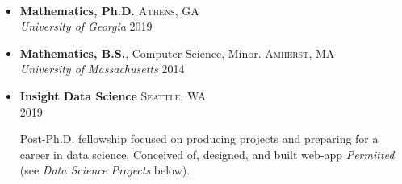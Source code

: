 \documentclass[10pt,a4paper]{article}
\begin{document}
\vspace{-0.4in}
\tabto{16.9cm}
{   
\\



  
\spacedhrule{0.5em}{-.04em}


\begin{itemize}
  \item \textbf{Mathematics, Ph.D.} \hfill \textsc{Athens, GA} \\
        \emph{University of Georgia} \hfill \textsc{2019}
  \item {\textbf{Mathematics, B.S.}, Computer Science, Minor. } \hfill \textsc{Amherst, MA} \\
  \emph{University of Massachusetts} \hfill \textsc{2014}
\end{itemize}

\spacedhrule{0.5em}{-0.4em}


\begin{itemize}
  \item \textbf{Insight Data Science} \hfill \textsc{Seattle, WA} \\
        \null \hfill \textsc{2019}

        \vspace{-1em}
  \parbox[H]{15cm}{ 
        Post-Ph.D. fellowship focused on producing projects and preparing for a career in data science. Conceived of, designed, and built web-app \emph{Permitted} (see \emph{Data Science Projects} below).
        }
\end{itemize}

\spacedhrule{0.5em}{-0.4em}

}
\end{document}
